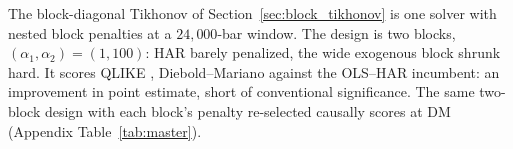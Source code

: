 The block-diagonal Tikhonov of Section~\ref{sec:block_tikhonov} is one
solver with nested block penalties at a $24{,}000$-bar window. The
design is two blocks, $(\alpha_1,\alpha_2)=(1,100)$: HAR barely
penalized, the wide exogenous block shrunk hard. It scores QLIKE
\unifBlkTwoUserQLIKE{}, Diebold--Mariano \unifBlkTwoUserDM{} against
the OLS--HAR incumbent: an improvement in point estimate, short of
conventional significance. The same two-block design with each block's
penalty re-selected causally scores \unifBlkTwoTunedQLIKE{} at DM
\unifBlkTwoTunedDM{} (Appendix Table~\ref{tab:master}).

